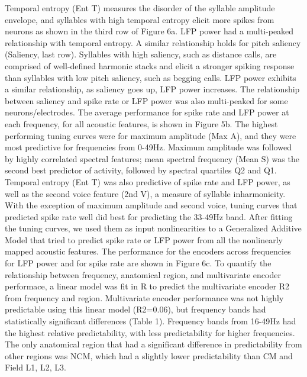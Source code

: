 Temporal entropy (Ent T) measures the disorder of the syllable amplitude envelope, and syllables with high temporal entropy elicit more spikes from neurons as shown in the third row of Figure 6a. LFP power had a multi-peaked relationship with temporal entropy. A similar relationship holds for pitch saliency (Saliency, last row). Syllables with high saliency, such as distance calls, are comprised of well-defined harmonic stacks and elicit a stronger spiking response than syllables with low pitch saliency, such as begging calls. LFP power exhibits a similar relationship, as saliency goes up, LFP power increases. The relationship between saliency and spike rate or LFP power was also multi-peaked for some neurons/electrodes.
The average performance for spike rate and LFP power at each frequency, for all acoustic features, is shown in Figure 5b. The highest performing tuning curves were for maximum amplitude (Max A), and they were most predictive for frequencies from 0-49Hz. Maximum amplitude was followed by highly correlated spectral features; mean spectral frequency (Mean S) was the second best predictor of activity, followed by spectral quartiles Q2 and Q1. Temporal entropy (Ent T) was also predictive of spike rate and LFP power, as well as the second voice feature (2nd V), a measure of syllable inharmonicity. With the exception of maximum amplitude and second voice, tuning curves that predicted spike rate well did best for predicting the 33-49Hz band.
    After fitting the tuning curves, we used them as input nonlinearities to a Generalized Additive Model that tried to predict spike rate or LFP power from all the nonlinearly mapped acoustic features. The performance for the encoders across frequencies for LFP power and for spike rate are shown in Figure 6c. To quantify the relationship between frequency, anatomical region, and multivariate encoder performace, a linear model was fit in R to predict the multivariate encoder R2 from frequency and region. Multivariate encoder performance was not highly predictable using this linear model (R2=0.06), but frequency bands had statistically significant differences (Table 1). Frequency bands from 16-49Hz had the highest relative predictability, with less predictability for higher frequencies. The only anatomical region that had a significant difference in predictability from other regions was NCM, which had a slightly lower predictability than CM and Field L1, L2, L3.


